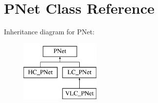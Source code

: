 \hypertarget{classPNet}{}\section{P\+Net Class Reference}
\label{classPNet}
Inheritance diagram for P\+Net\+:\begin{figure}[H]
\begin{center}
\leavevmode
\includegraphics[height=3.000000cm]{classPNet}
\end{center}
\end{figure}

